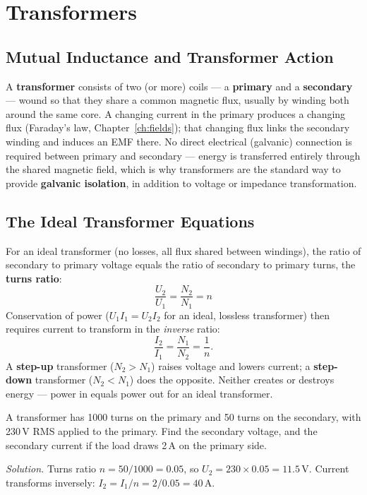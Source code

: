 \chapter{Transformers}
\label{ch:transformers}

\section{Mutual Inductance and Transformer Action}

A \textbf{transformer} consists of two (or more) coils --- a
\textbf{primary} and a \textbf{secondary} --- wound so that they share a
common magnetic flux, usually by winding both around the same core. A
changing current in the primary produces a changing flux (Faraday's law,
Chapter~\ref{ch:fields}); that changing flux links the secondary winding
and induces an EMF there. No direct electrical (galvanic) connection is
required between primary and secondary --- energy is transferred
entirely through the shared magnetic field, which is why transformers
are the standard way to provide \textbf{galvanic isolation}, in addition
to voltage or impedance transformation.

\section{The Ideal Transformer Equations}

For an ideal transformer (no losses, all flux shared between windings),
the ratio of secondary to primary voltage equals the ratio of secondary
to primary turns, the \textbf{turns ratio}:
\[
\boxed{\frac{U_2}{U_1} = \frac{N_2}{N_1} = n}
\]
Conservation of power ($U_1 I_1 = U_2 I_2$ for an ideal, lossless
transformer) then requires current to transform in the \emph{inverse}
ratio:
\[
\frac{I_2}{I_1} = \frac{N_1}{N_2} = \frac{1}{n}.
\]
A \textbf{step-up} transformer ($N_2 > N_1$) raises voltage and lowers
current; a \textbf{step-down} transformer ($N_2 < N_1$) does the
opposite. Neither creates or destroys energy --- power in equals power
out for an ideal transformer.

\begin{examplebox}
A transformer has 1000 turns on the primary and 50 turns on the
secondary, with 230\,V RMS applied to the primary. Find the secondary
voltage, and the secondary current if the load draws 2\,A on the primary
side.

\emph{Solution.} Turns ratio $n = 50/1000 = 0.05$, so
$U_2 = 230 \times 0.05 = 11.5\,\text{V}$. Current transforms inversely:
$I_2 = I_1/n = 2/0.05 = 40\,\text{A}$.
\end{examplebox}

